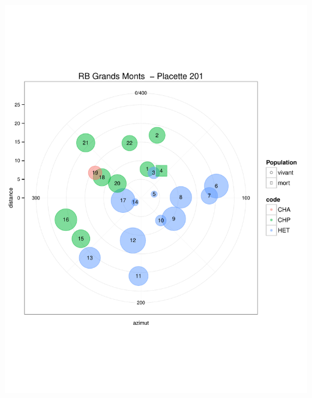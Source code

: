 \documentclass[a4paper]{book}\usepackage[]{graphicx}\usepackage[]{color}
\makeatletter
\def\maxwidth{ %
  \ifdim\Gin@nat@width>\linewidth
    \linewidth
  \else
    \Gin@nat@width
  \fi
}
\newenvironment{knitrout}{}{} %
\makeatother
\begin{document}
\begin{knitrout}
{\centering \includegraphics[width=\maxwidth]{Figures/PlanArbres-16} 

}





\end{knitrout}
\end{document}
